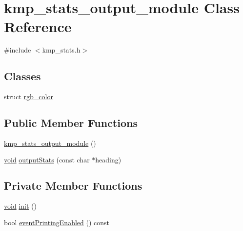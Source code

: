 \hypertarget{classkmp__stats__output__module}{\section{kmp\-\_\-stats\-\_\-output\-\_\-module Class Reference}
\label{classkmp__stats__output__module}
}


{\ttfamily \#include $<$kmp\-\_\-stats.\-h$>$}

\subsection*{Classes}
\begin{DoxyCompactItemize}
\item 
struct \hyperlink{structkmp__stats__output__module_1_1rgb__color}{rgb\-\_\-color}
\end{DoxyCompactItemize}
\subsection*{Public Member Functions}
\begin{DoxyCompactItemize}
\item 
\hyperlink{classkmp__stats__output__module_a137ba00a21ba50bcc22a9f74159bb519}{kmp\-\_\-stats\-\_\-output\-\_\-module} ()
\item 
\hyperlink{ittnotify__static_8h_af941d56e55e3c5465135b60c4d6343ed}{void} \hyperlink{classkmp__stats__output__module_a4e2f6da3c56c6d34d6bc13ef056c8372}{output\-Stats} (const char $\ast$heading)
\end{DoxyCompactItemize}
\subsection*{Private Member Functions}
\begin{DoxyCompactItemize}
\item 
\hyperlink{ittnotify__static_8h_af941d56e55e3c5465135b60c4d6343ed}{void} \hyperlink{classkmp__stats__output__module_a003974369e2c2530f671b67f1cc00e08}{init} ()
\item 
bool \hyperlink{classkmp__stats__output__module_a9aeeac53a52599c4f50c7be846ef6e7c}{event\-Printing\-Enabled} () const 
\end{DoxyCompactItemize}
